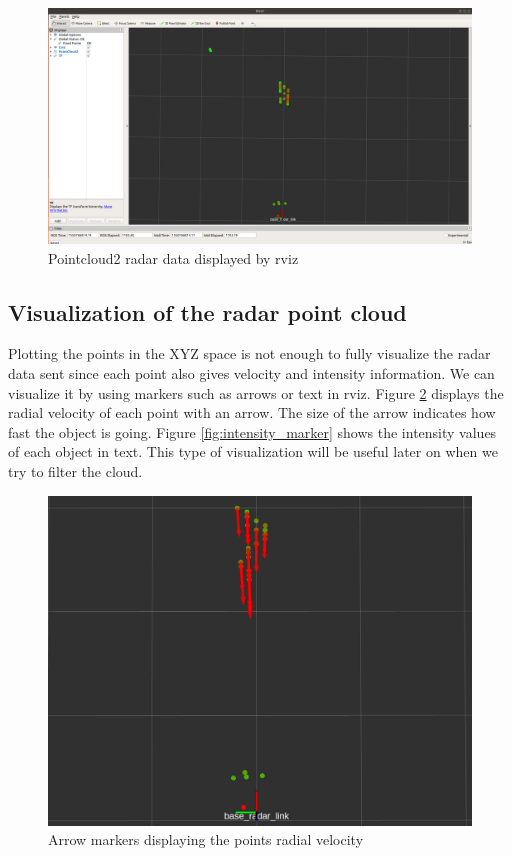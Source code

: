 \documentclass[12pt]{article}
\begin{document}
\begin{figure}[!htb]
    \centering
    \includegraphics[scale=0.2]{pc_not_filt.png}
    \caption{Pointcloud2 radar data displayed by rviz}
    \label{fig:radar_rviz}
\end{figure}
\subsection{Visualization of the radar point cloud}
Plotting the points in the XYZ space is not enough to fully visualize the radar data sent since each point also gives velocity and intensity information.
We can visualize it by using markers such as arrows or text in rviz.
Figure \ref{fig:doppler_marker} displays the radial velocity of each point with an arrow. The size of the arrow indicates how fast the object is going. Figure \ref{fig:intensity_marker} shows the intensity values of each object in text. This type of visualization will be useful later on when we try to filter the cloud.

\begin{figure}[!htb]
    \centering
    \includegraphics[scale=0.25]{doppler_marker.png}
    \caption{Arrow markers displaying the points radial velocity}
    \label{fig:doppler_marker}
\end{figure}
\end{document}
